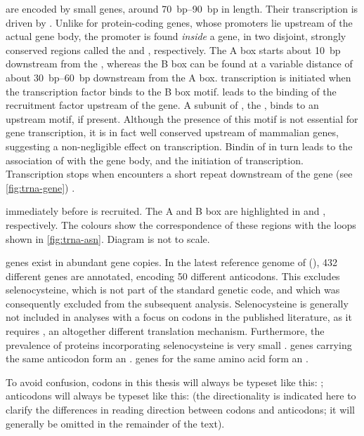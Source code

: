 \trna[s] are encoded by small genes, around \SIrange{70}{90}{bp} in length.
Their transcription is driven by . Unlike for protein-coding genes, whose
promoters lie upstream of the actual gene body, the promoter is found
\emph{inside} a \trna gene, in two disjoint, strongly conserved regions called
the  and , respectively. The A box starts about
\SI{10}{bp} downstream from the \tss, whereas the B box can be found at a
variable distance of about \SIrange{30}{60}{bp} downstream from the A box. \trna
transcription is initiated when the transcription factor \tfiiic binds to the B
box motif. \tfiiic leads to the binding of the  recruitment factor \tfiiib
upstream of the \trna gene. A subunit of \tfiiib, the \tbp, binds to an upstream
 motif, if present. Although the presence of this motif is not
essential for \trna gene transcription, it is in fact well conserved upstream of
mammalian \trna genes, suggesting a non-negligible effect on transcription.
Bindin of \tfiiib in turn leads to the association of  with the gene body,
and the initiation of transcription. Transcription stops when  encounters a
short \nT repeat downstream of the \trna gene (see \cref{fig:trna-gene})
\citep{White:1998,Dieci:2007}.

    {immediately before  is recruited. The A and B box are highlighted in
    \primaryname{} and \secondaryname{}, respectively. The colours show the
    correspondence of these regions with the loops shown in \cref{fig:trna-asn}.
    Diagram is not to scale.}

\trna genes exist in abundant gene copies. In the latest reference genome of
\mmu (), \num{432} different
\trna genes are annotated, encoding \num{50} different anticodons. This excludes
selenocysteine, which is not part of the standard genetic code, and which was
consequently excluded from the subsequent analysis. Selenocysteine is generally
not included in analyses with a focus on codons in the published literature, as
it requires , an altogether different translation
mechanism. Furthermore, the prevalence of proteins incorporating selenocysteine
is very small \citep{Reeves:2009}. \trna genes carrying the same anticodon form
an . \trna genes for the same amino acid
form an .

To avoid confusion, codons in this thesis will always be typeset like this:
; anticodons will always be typeset like this:
 (the directionality is indicated here to clarify the
differences in reading direction between codons and anticodons; it will
generally be omitted in the remainder of the text).

